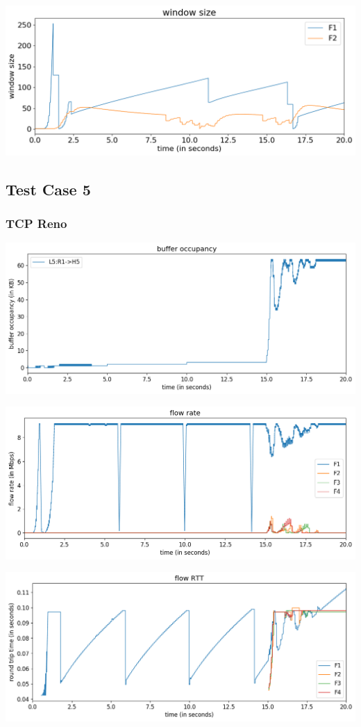 \documentclass{article}
\begin{document}
\includegraphics[width = \textwidth]{"test_case4 window size"}




\subsection{Test Case 5}

\subsubsection{TCP Reno}

\includegraphics[width = \textwidth]{"test_case5_reno buffer occupancy"}

\includegraphics[width = \textwidth]{"test_case5_reno flow rate"}

\includegraphics[width = \textwidth]{"test_case5_reno flow RTT"}
\end{document}
